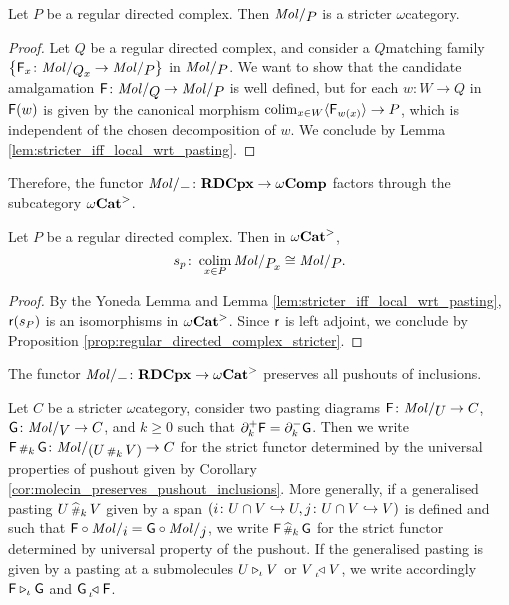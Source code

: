 \begin{prop} \label{prop:regular_directed_complex_stricter}
    Let \( P \) be a regular directed complex.
    Then \( \molecin{P} \) is a stricter \( \omega \)\nbd category.
\end{prop}
\begin{proof}
    Let \( Q \) be a regular directed complex, and consider a \( Q \)\nbd matching family \( \set{\F_x \colon \molecin{\imel{Q}{x}} \to \molecin{P}} \) in \( \molecin{P} \).
    We want to show that the candidate amalgamation \( \F \colon \molecin{Q} \to \molecin{P} \) is well defined, but for each \( w \colon W \to Q \) in \( \mathsf{F}(w) \) is given by the canonical morphism \( \operatorname*{colim}_{x \in W} \langle\mathsf{F}_{w(x)}\rangle \to P \), which is independent of the chosen decomposition of \( w \).
    We conclude by Lemma \ref{lem:stricter_iff_local_wrt_pasting}.
\end{proof}

\noindent Therefore, the functor \( \molecin{-} \colon \rdcpx \to \Comp \) factors through the subcategory \( {\omega\mathbf{Cat}}^> \).

\begin{cor} \label{cor:regular_directed_complex_colimit_of_itself}
    Let \( P \) be a regular directed complex.
    Then in \( {\omega\mathbf{Cat}}^> \),
    \begin{equation*}
        s_p \colon \colim_{x \in P} \molecin{\imel{P}{x}} \cong \molecin{P}.
    \end{equation*}
\end{cor}
\begin{proof}
    By the Yoneda Lemma and Lemma \ref{lem:stricter_iff_local_wrt_pasting}, \( \mathsf{r}(s_P) \) is an isomorphisms in \( {\omega\mathbf{Cat}}^> \).
    Since \( \mathsf{r} \) is left adjoint, we conclude by Proposition \ref{prop:regular_directed_complex_stricter}.
\end{proof}

\begin{cor} \label{cor:molecin_preserves_pushout_inclusions}
    The functor \( \molecin{-} \colon \rdcpx \to \somegaCat \) preserves all pushouts of inclusions. 
\end{cor}

\begin{dfn} 
    Let \( C \) be a stricter \( \omega \)\nbd category, consider two pasting diagrams \( \F \colon \molecin{U} \to C \), \( \G \colon \molecin{V} \to C \), and \( k \geq 0 \) such that \( \partial_{k}^{+} \mathsf{F} = \partial_{k}^{-} \mathsf{G} \).
    Then we write \( \F \cp{k} \G \colon \molecin{(U \cp{k} V)} \to C \) for the strict functor determined by the universal properties of pushout given by Corollary \ref{cor:molecin_preserves_pushout_inclusions}.
    More generally, if a generalised pasting \( U \,{\scriptstyle\widehat{\#}}_{k}\, V \) given by a span \( (i \colon U \cap V \hookrightarrow U, j \colon U \cap V \hookrightarrow V) \) is defined and such that \( \F \after \molecin{i} = \G \after \molecin{j} \), we write \( \mathsf{F} \,{\scriptstyle\widehat{\#}}_{k}\, \mathsf{G} \) for the strict functor determined by universal property of the pushout.
    If the generalised pasting is given by a pasting at a submolecules \( U \triangleright_{\iota} V \) or \( V \prescript{}{\iota\!}{\triangleleft}\; V \), we write accordingly \( \mathsf{F} \triangleright_{\iota} \mathsf{G} \) and \( \mathsf{G} \prescript{}{\iota\!}{\triangleleft}\; \mathsf{F} \).
\end{dfn}

